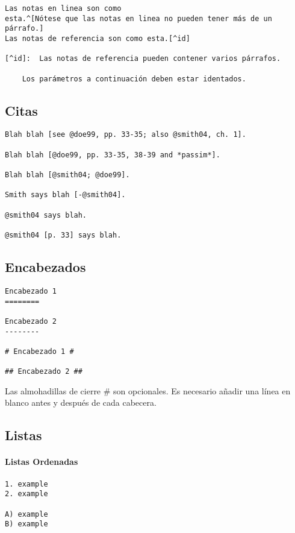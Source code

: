 \documentclass[12pt,spanish,]{article}
\let\oldparagraph\paragraph
\renewcommand{\paragraph}[1]{\oldparagraph{#1}\mbox{}}
\begin{document}
\begin{verbatim}
Las notas en linea son como
esta.^[Nótese que las notas en linea no pueden tener más de un párrafo.]
Las notas de referencia son como esta.[^id]

[^id]:  Las notas de referencia pueden contener varios párrafos.

    Los parámetros a continuación deben estar identados.
\end{verbatim}

\subsection{Citas}\label{citas}

\begin{verbatim}
Blah blah [see @doe99, pp. 33-35; also @smith04, ch. 1].

Blah blah [@doe99, pp. 33-35, 38-39 and *passim*].

Blah blah [@smith04; @doe99].

Smith says blah [-@smith04].

@smith04 says blah.

@smith04 [p. 33] says blah.
\end{verbatim}

\subsection{Encabezados}\label{encabezados}

\begin{verbatim}
Encabezado 1
========

Encabezado 2
--------

# Encabezado 1 #

## Encabezado 2 ##
\end{verbatim}

Las almohadillas de cierre \# son opcionales. Es necesario añadir una
línea en blanco antes y después de cada cabecera.

\subsection{Listas}\label{listas}

\paragraph{Listas Ordenadas}\label{listas-ordenadas}

\begin{verbatim}
1. example
2. example

A) example
B) example
\end{verbatim}
\end{document}
